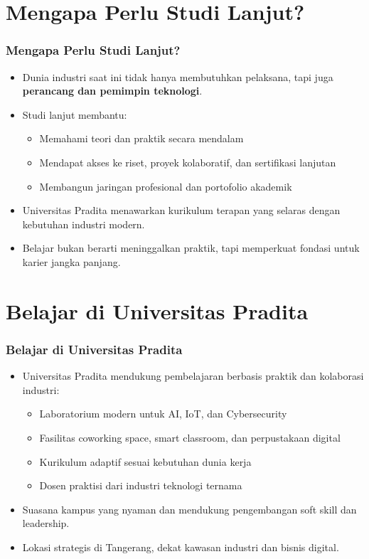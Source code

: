 \documentclass[aspectratio=169, table]{beamer}
\begin{document}
\section{Mengapa Perlu Studi Lanjut?}
\begin{frame}
	\frametitle{Mengapa Perlu Studi Lanjut?}
	\vspace{10pt}
	\begin{itemize}
		\item Dunia industri saat ini tidak hanya membutuhkan pelaksana, tapi juga \textbf{perancang dan pemimpin teknologi}.
		\item Studi lanjut membantu:
		\begin{itemize}
			\item Memahami teori dan praktik secara mendalam
			\item Mendapat akses ke riset, proyek kolaboratif, dan sertifikasi lanjutan
			\item Membangun jaringan profesional dan portofolio akademik
		\end{itemize}
		\item Universitas Pradita menawarkan kurikulum terapan yang selaras dengan kebutuhan industri modern.
		\item Belajar bukan berarti meninggalkan praktik, tapi memperkuat fondasi untuk karier jangka panjang.
	\end{itemize}
\end{frame}

\section{Belajar di Universitas Pradita}
\begin{frame}
	\frametitle{Belajar di Universitas Pradita}
	\vspace{10pt}
	\begin{itemize}
		\item Universitas Pradita mendukung pembelajaran berbasis praktik dan kolaborasi industri:
		\begin{itemize}
			\item Laboratorium modern untuk AI, IoT, dan Cybersecurity
			\item Fasilitas coworking space, smart classroom, dan perpustakaan digital
			\item Kurikulum adaptif sesuai kebutuhan dunia kerja
			\item Dosen praktisi dari industri teknologi ternama
		\end{itemize}
		\item Suasana kampus yang nyaman dan mendukung pengembangan soft skill dan leadership.
		\item Lokasi strategis di Tangerang, dekat kawasan industri dan bisnis digital.
	\end{itemize}
\end{frame}
\end{document}
